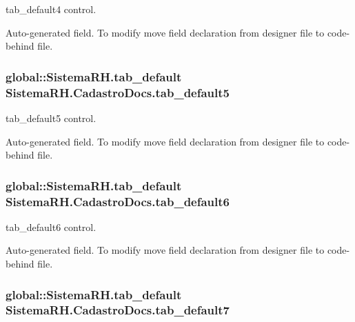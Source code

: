 tab\_\-default4 control. 

Auto-\/generated field. To modify move field declaration from designer file to code-\/behind file. \hypertarget{class_sistema_r_h_1_1_cadastro_docs_a5012be717fd91c8991567529203d4c50}{
\subsubsection[{tab\_\-default5}]{\setlength{\rightskip}{0pt plus 5cm}global::SistemaRH.tab\_\-default {\bf SistemaRH.CadastroDocs.tab\_\-default5}}}
\label{class_sistema_r_h_1_1_cadastro_docs_a5012be717fd91c8991567529203d4c50}


tab\_\-default5 control. 

Auto-\/generated field. To modify move field declaration from designer file to code-\/behind file. \hypertarget{class_sistema_r_h_1_1_cadastro_docs_ae2f3ab74b04be41fbe19994589186f84}{
\subsubsection[{tab\_\-default6}]{\setlength{\rightskip}{0pt plus 5cm}global::SistemaRH.tab\_\-default {\bf SistemaRH.CadastroDocs.tab\_\-default6}}}
\label{class_sistema_r_h_1_1_cadastro_docs_ae2f3ab74b04be41fbe19994589186f84}


tab\_\-default6 control. 

Auto-\/generated field. To modify move field declaration from designer file to code-\/behind file. \hypertarget{class_sistema_r_h_1_1_cadastro_docs_a966849510487a63bb68e107d5d841330}{
\subsubsection[{tab\_\-default7}]{\setlength{\rightskip}{0pt plus 5cm}global::SistemaRH.tab\_\-default {\bf SistemaRH.CadastroDocs.tab\_\-default7}}}
\label{class_sistema_r_h_1_1_cadastro_docs_a966849510487a63bb68e107d5d841330}


